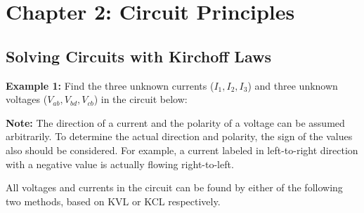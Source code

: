 \documentclass{article}
\begin{document}
\section*{Chapter 2: Circuit Principles}

\subsection*{Solving Circuits with Kirchoff Laws}

{\bf Example 1:} Find the three unknown currents ($I_1,I_2,I_3$) and three 
	unknown voltages ($V_{ab}, V_{bd}, V_{cb}$) in the circuit below:


{\bf Note:} The direction of a current and the polarity of a voltage can
be assumed arbitrarily. To determine the actual direction and polarity, 
the sign of the values also should be considered. For example, a current 
labeled in left-to-right direction with a negative value is actually flowing 
right-to-left.

All voltages and currents in the circuit can be found by either of the 
following two methods, based on KVL or KCL respectively.
\end{document}
